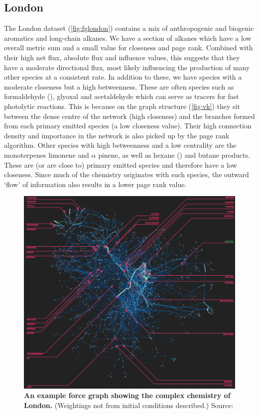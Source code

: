 \subsection*{London}
The London dataset (\autoref{fig:fglondon}) contains a mix of anthropogenic and biogenic aromatics and long-chain alkanes. We have a section of alkanes which have a low overall metric sum and a small value for closeness and page rank. Combined with their high net flux, absolute flux and influence values, this suggests that they have a moderate directional flux, most likely influencing the production of many other species at a consistent rate. In addition to these, we have species with a moderate closeness but a high betweenness. These are often species such as formaldehyde (), glyoxal and acetaldehyde which can serve as tracers for fast photolytic reactions. This is because on the graph structure (\autoref{fig:vk}) they sit between the dense centre of the network (high closeness) and the branches formed from each primary emitted species (a low closeness value). Their high connection density and importance in the network is also picked up by the page rank algorithm. Other species with high betweenness and a low centrality are the monoterpenes limonene and $\alpha$ pinene, as well as hexane () and butane products. These are (or are close to) primary emitted species and therefore have a low closeness. Since much of the chemistry originates with such species, the outward `flow' of information also results in a lower page rank value.

\begin{figure}[H]
     \centering
         \includegraphics[width=.95\textwidth]{figures/lewis.png}
        \caption{ \textbf{An example force graph showing the complex chemistry of London.} (Weightings not from initial conditions described.) Source: \citep{science}  }
        \label{fig:fglondon}
\end{figure}



